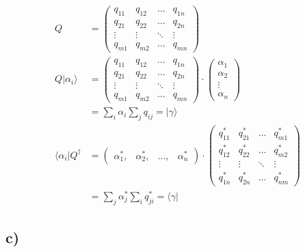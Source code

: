     \begin{align*}
        Q &=
        \begin{pmatrix}
        q_{11} & q_{12} & \ldots & q_{1n}\\
        q_{21} & q_{22} & \ldots & q_{2n}\\
        \vdots & \vdots & \ddots & \vdots\\
        q_{m1} & q_{m2} & \ldots & q_{mn}
        \end{pmatrix}\\
        Q \vert \alpha_i \rangle &=
        \begin{pmatrix}
        q_{11} & q_{12} & \ldots & q_{1n}\\
        q_{21} & q_{22} & \ldots & q_{2n}\\
        \vdots & \vdots & \ddots & \vdots\\
        q_{m1} & q_{m2} & \ldots & q_{mn}
        \end{pmatrix} \cdot 
        \begin{pmatrix}
            \alpha_1\\
            \alpha_2\\
            \vdots\\
            \alpha_n
        \end{pmatrix}\\
        &= \sum_{i} \alpha_i \sum_{j} q_{ij} = \vert \gamma \rangle\\
        \langle \alpha_i \vert Q^{\dagger} &=
        \begin{pmatrix}
            \alpha_1^*, & \alpha_2^*, & \ldots, & \alpha_n^*
        \end{pmatrix} \cdot 
        \begin{pmatrix}
        q_{11}^* & q_{21}^* & \ldots & q_{m1}^*\\
        q_{12}^* & q_{22}^* & \ldots & q_{m2}^*\\
        \vdots & \vdots & \ddots & \vdots\\
        q_{1n}^* & q_{2n}^* & \ldots & q_{nm}^*
        \end{pmatrix}\\
        &= \sum_{j} \alpha_j^* \sum_{i} q_{ji}^* = \langle \gamma \vert
    \end{align*}

\subsection{c)}

